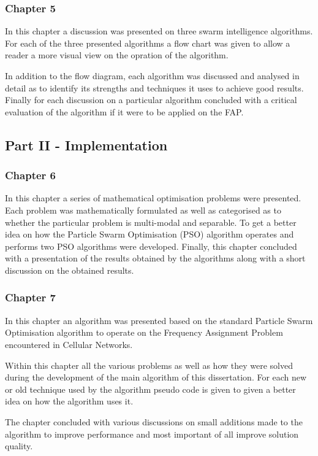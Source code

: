 \subsubsection{Chapter 5}
In this chapter a discussion was presented on three swarm intelligence algorithms. For each of the three presented algorithms a flow chart was given to allow a reader a more visual view on the opration of the algorithm. 

In addition to the flow diagram, each algorithm was discussed and analysed in detail as to identify its strengths and techniques it uses to achieve good results. Finally for each discussion on a particular algorithm concluded with a critical evaluation of the algorithm if it were to be applied on the FAP.
\subsection{Part II - Implementation}
\subsubsection{Chapter 6}
In this chapter a series of mathematical optimisation problems were presented. Each problem was mathematically formulated as well as categorised as to whether the particular problem is multi-modal and separable.
To get a better idea on how the Particle Swarm Optimisation (PSO) algorithm operates and performs two PSO algorithms were developed. Finally, this chapter concluded with a presentation of the results obtained by the algorithms along with a short discussion on the obtained results.
\subsubsection{Chapter 7}
In this chapter an algorithm was presented based on the standard Particle Swarm Optimisation algorithm to operate on the Frequency Assignment Problem encountered in Cellular Networks.

Within this chapter all the various problems as well as how they were solved during the development of the main algorithm of this dissertation. For each new or old technique used by the algorithm pseudo code is given to given a better idea on how the algorithm uses it.

The chapter concluded with various discussions on small additions made to the algorithm to improve performance and most important of all improve solution quality.
